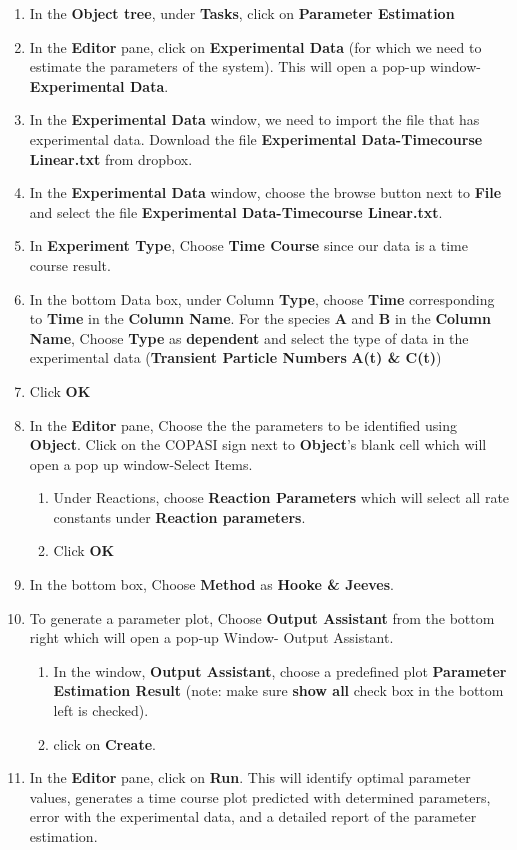 \documentclass[10pt]{article}
\theoremstyle{definition}
\theoremstyle{remark}
\begin{document}
		\begin{enumerate}[start=1]\def\makelabel{\textbf{Step}~}
			\item In the \textbf{Object tree}, under \textbf{Tasks}, click on \textbf{Parameter Estimation}
			\item In the \textbf{Editor} pane, click on \textbf{Experimental Data} (for which we need to estimate the parameters of the system). This will open a pop-up window-\textbf{Experimental Data}. 
			\item In the \textbf{Experimental Data} window, we need to import the file that has experimental data. Download the file \textbf{Experimental Data-Timecourse Linear.txt} from dropbox.
			\item In the \textbf{Experimental Data} window, choose the browse button next to \textbf{File} and select the file  \textbf{Experimental Data-Timecourse Linear.txt}.
			\item In \textbf{Experiment Type}, Choose \textbf{Time Course} since our data is a time course result.
			\item In the bottom Data box, under Column \textbf{Type}, choose \textbf{Time} corresponding to \textbf{Time} in the \textbf{Column Name}. For the species \textbf{A} and \textbf{B} in the \textbf{Column Name}, Choose \textbf{Type} as \textbf{dependent} and select the type of data in the experimental data (\textbf{Transient Particle Numbers} \textbf{A(t) \& C(t)}) 
			\item Click \textbf{OK}
			\item In the \textbf{Editor} pane, Choose the the parameters to be identified using \textbf{Object}. Click on the COPASI sign next to \textbf{Object}'s blank cell which will open a pop up window-{Select Items}.
			\begin{enumerate}
				\item Under Reactions, choose \textbf{Reaction Parameters} which will select all rate constants under \textbf{Reaction parameters}. 
				\item Click \textbf{OK}
			\end{enumerate}
			\item In the bottom box, Choose \textbf{Method} as \textbf{Hooke \& Jeeves}.
			\item To generate a parameter plot, Choose \textbf{Output Assistant} from the bottom right which will open a pop-up Window- {Output Assistant}.
			\begin{enumerate}
				\item In the window, \textbf{Output Assistant}, choose a predefined plot \textbf{Parameter Estimation Result} (note: make sure \textbf{show all} check box in the bottom left is checked).
				\item click on \textbf{Create}.        
			\end{enumerate}
			\item In the \textbf{Editor} pane, click on \textbf{Run}. This will identify optimal parameter values, generates a time course plot predicted with determined parameters, error with the experimental data, and a detailed report of the parameter estimation.
		\end{enumerate}
\end{document}
